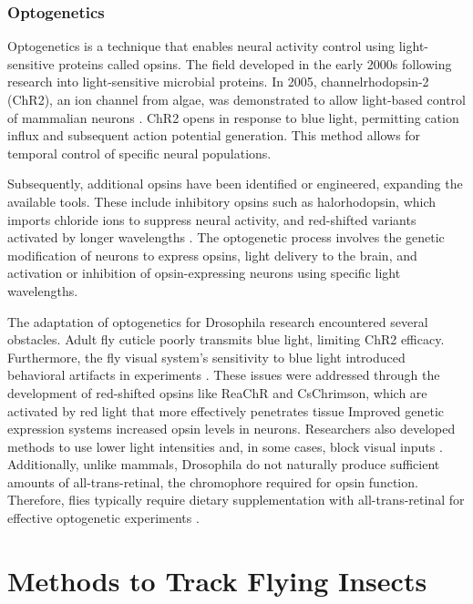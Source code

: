 \documentclass[../main/thesis_msc.tex]{subfiles}
\begin{document}
	\subsubsection{Optogenetics}

	Optogenetics is a technique that enables neural activity control using light-sensitive proteins called opsins. The field developed in the early 2000s following research into light-sensitive microbial proteins. In 2005, channelrhodopsin-2 (ChR2), an ion channel from algae, was demonstrated to allow light-based control of mammalian neurons \autocite{boyden_millisecond-timescale_2005}. ChR2 opens in response to blue light, permitting cation influx and subsequent action potential generation. This method allows for temporal control of specific neural populations.

	Subsequently, additional opsins have been identified or engineered, expanding the available tools. These include inhibitory opsins such as halorhodopsin, which imports chloride ions to suppress neural activity, and red-shifted variants activated by longer wavelengths \autocite{inagaki_optogenetic_2014}. The optogenetic process involves the genetic modification of neurons to express opsins, light delivery to the brain, and activation or inhibition of opsin-expressing neurons using specific light wavelengths.

	The adaptation of optogenetics for Drosophila research encountered several obstacles. Adult fly cuticle poorly transmits blue light, limiting ChR2 efficacy. Furthermore, the fly visual system's sensitivity to blue light introduced behavioral artifacts in experiments \autocite{kim_cellular_2015}. These issues were addressed through the development of red-shifted opsins like ReaChR and CsChrimson, which are activated by red light that more effectively penetrates tissue \autocite{inagaki_optogenetic_2014,klapoetke2014independent} Improved genetic expression systems increased opsin levels in neurons. Researchers also developed methods to use lower light intensities and, in some cases, block visual inputs \autocite{kim_cellular_2015}. Additionally, unlike mammals, Drosophila do not naturally produce sufficient amounts of all-trans-retinal, the chromophore required for opsin function. Therefore, flies typically require dietary supplementation with all-trans-retinal for effective optogenetic experiments \autocite{kim_cellular_2015}.

	\section{Methods to Track Flying Insects}
\end{document}
